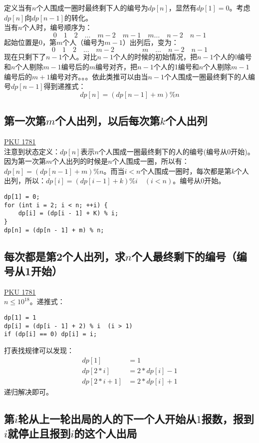 定义当有$n$个人围成一圈时最终剩下人的编号为$dp[n]$，显然有$dp[1]=0$。考虑$dp[n]$向$dp[n-1]$的转化。 \\
当有$n$个人时，编号顺序为：
$$
0\quad 1\quad 2\quad \dots\quad m-2\quad m-1\quad m \dots \quad n-2 \quad n-1
$$
起始位置是0，第$m$个人（编号为$m-1$）出列后，变为：
$$
0\quad 1\quad 2\quad \dots\quad m-2\qquad \qquad m\quad \dots \quad n-2\quad n-1
$$
现在只剩下了$n-1$个人。对比$n-1$个人的时候的初始情况，把$n-1$个人的0编号和$n$个人剔除$m-1$编号后的$m$编号对齐，把$n-1$个人的1编号和$n$个人剔除$m-1$编号后的$m+1$编号对齐。。。依此类推可以由当$n-1$个人围成一圈最终剩下的人编号$dp[n-1]$得到递推式：
$$dp[n]=(dp[n-1]+m)\% n$$

\subsection{第一次第$m$个人出列，以后每次第$k$个人出列}
\underline {PKU 1781}\\

注意到状态定义：$dp[n]$表示$n$个人围成一圈最终剩下的人的编号(编号从0开始)。因为第一次第$m$个人出列的时候是$n$个人围成一圈，所以有：$dp[n]=(dp[n-1]+m)\%n$。而当$i < n$个人围成一圈时，每次都是第$k$个人出列，所以：$dp[i]=(dp[i-1]+k)\%i\quad (i < n)$。编号从0开始。

\begin{lstlisting}
dp[1] = 0;
for (int i = 2; i < n; ++i) {
	dp[i] = (dp[i - 1] + K) % i;
}
dp[n] = (dp[n - 1] + m) % n;
\end{lstlisting}

\subsection{每次都是第2个人出列，求$n$个人最终剩下的编号（编号从1开始）}
\underline {PKU 1781} \\

$n\leq 10^{18}$。递推式：

\begin{lstlisting}
dp[1] = 1
dp[i] = (dp[i - 1] + 2) % i  (i > 1)
if (dp[i] == 0) dp[i] = i;
\end{lstlisting}

打表找规律可以发现：
\[
\begin{aligned}
dp[1] &= 1 \\
dp[2*i] &= 2 * dp[i] - 1 \\
dp[2*i+1] &= 2 * dp[i] + 1
\end{aligned}
\]
递归解决即可。

\subsection{第$i$轮从上一轮出局的人的下一个人开始从$1$报数，报到$i$就停止且报到$i$的这个人出局}

